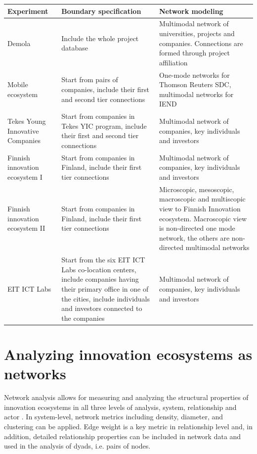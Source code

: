 \begingroup
{}\label{tab:networkdesign}
\begin{tabular}{p{3cm} p{4cm} p{5cm}}
\toprule
Experiment & Boundary specification & Network modeling \\
\midrule

Demola &
Include the whole project database &
Multimodal network of universities, projects and companies. Connections are formed through project affiliation \\

Mobile ecosystem &
Start from pairs of companies, include their first and second tier connections &
One-mode networks for Thomson Reuters SDC, multimodal networks for IEND \\

Tekes Young Innovative Companies &
Start from companies in Tekes YIC program, include their first and second tier connections &
Multimodal network of companies, key individuals and investors \\

Finnish innovation ecosystem I & 
Start from companies in Finland, include their first tier connections & 
Multimodal network of companies, key individuals and investors \\

Finnish innovation ecosystem II &
Start from companies in Finland, include their first tier connections &
Microscopic, mesoscopic, macroscopic and multiscopic view to Finnish Innovation ecosystem. Macroscopic view is non-directed one mode network, the others are non-directed multimodal networks \\

EIT ICT Labs &
Start from the six EIT ICT Labs co-location centers, include companies having their primary office in one of the cities, include individuals and investors connected to the companies &
Multimodal network of companies, key individuals and investors \\
\bottomrule
\end{tabular}
\endgroup

\section{Analyzing innovation ecosystems as networks}

Network analysis allows for measuring and analyzing the structural properties of innovation ecosystems in all three levels of analysis, system, relationship and actor \citep{Jarvi2016TakingReview}. In system-level, network metrics including density, diameter, and clustering can be applied. Edge weight is a key metric in relationship level and, in addition, detailed relationship properties can be included in network data and used in the analysis of dyads, i.e. pairs of nodes.

